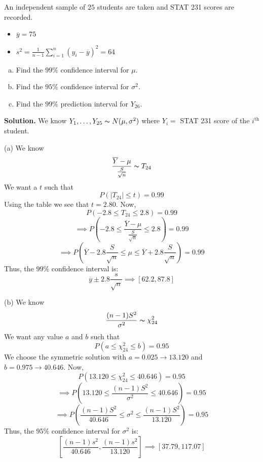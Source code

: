 \begin{exbox}
    \begin{example}
        An independent sample of $ 25 $ students are taken and STAT 231 scores are recorded.
        \begin{itemize}
            \item $ \overline{y}=75 $
            \item $ s^2=\frac{1}{n-1} \sum\limits_{i=1}^{n} (y_i-\overline{y})^2=64 $
        \end{itemize}
        \begin{enumerate}[(a)]
            \item Find the $ 99\% $ confidence interval for $ \mu $.
            \item Find the $ 95\% $ confidence interval for $ \sigma^2 $.
            \item Find the $ 99\% $ prediction interval for $ Y_{26} $.
        \end{enumerate}
        \textbf{Solution.} We know $ Y_1,\ldots ,Y_{25} \thicksim N(\mu,\sigma^2) $
        where $ Y_i= $ STAT 231 score of the $ i^{\text{th}} $ student.

        (a) We know
        \[ \frac{\overline{Y}-\mu}{\frac{S}{\sqrt{n}}} \thicksim T_{24} \]
        We want a $ t $ such that
        \[ P(|T_{24}|\leqslant t)=0.99 \]
        Using the table we see that $ t=2.80 $. Now,
        \[ P(-2.8\leqslant T_{24}\leqslant 2.8)=0.99 \]
        \[ \implies P\left(-2.8\leqslant \frac{\overline{Y}-\mu}{\frac{S}{\sqrt{n}}}
            \leqslant 2.8\right)=0.99 \]
        \[ \implies P\left(\overline{Y}-2.8 \frac{S}{\sqrt{n}}\leqslant \mu\leqslant \overline{Y}+
            2.8 \frac{S}{\sqrt{n}}\right)=0.99 \]
        Thus, the $ 99\% $ confidence interval is:
        \[ \overline{y}\pm 2.8 \frac{s}{\sqrt{n}}\implies \left[ 62.2, 87.8 \right] \]

        (b) We know
        \[ \frac{(n-1)S^2}{\sigma^2} \thicksim \chi^2_{24}  \]
        We want any value $ a $ and $ b $ such that
        \[ P(a\leqslant \chi^2_{24}\leqslant b)=0.95 \]
        We choose the symmetric solution with $ a=0.025\rightarrow 13.120 $ and $ b=0.975\rightarrow 40.646 $.
        Now,
        \[ P\left( 13.120\leqslant \chi^2_{24}\leqslant 40.646 \right)=0.95 \]
        \[ \implies P\left( 13.120\leqslant \frac{(n-1) S^2}{\sigma^2}\leqslant 40.646 \right)=0.95 \]
        \[ \implies P\left( \frac{(n-1)S^2}{40.646}\leqslant \sigma^2 \leqslant \frac{(n-1)S^2}{13.120} \right)=0.95 \]
        Thus, the $ 95\% $ confidence interval for $ \sigma^2 $ is:
        \[ \left[ \frac{(n-1)s^2}{40.646} , \frac{(n-1)s^2}{13.120} \right]\implies
            \left[ 37.79, 117.07 \right] \]


\end{example}
\end{exbox}
